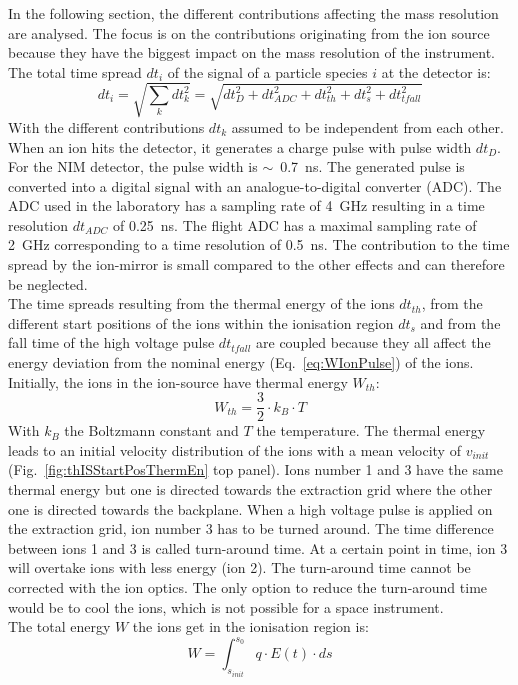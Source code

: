	In the following section, the different contributions affecting the mass resolution are analysed. The focus is on the contributions originating from the ion source because they have the biggest impact on the mass resolution of the instrument.\\
	The total time spread $dt_i$ of the signal of a particle species $i$ at the detector is:
	\begin{equation}
		dt_i = \sqrt{\sum_{k} dt_k^2} = \sqrt{dt_D^2 + dt_{ADC}^2 + dt_{th}^2 + dt_{s}^2 + dt_{tfall}^2}
		\label{eq:dti}
	\end{equation}
	With the different contributions $dt_k$ assumed to be independent from each other. When an ion hits the detector, it generates a charge pulse with pulse width $dt_D$. For the NIM detector, the pulse width is $\sim$~0.7~ns. The generated pulse is converted into a digital signal with an analogue-to-digital converter (ADC). The ADC used in the laboratory has a sampling rate of 4~GHz resulting in a time resolution $dt_{ADC}$ of 0.25~ns. The flight ADC has a maximal sampling rate of 2~GHz corresponding to a time resolution of 0.5~ns. The contribution to the time spread by the ion-mirror is small compared to the other effects and can therefore be neglected.\\ %

	The time spreads resulting from the thermal energy of the ions $dt_{th}$, from the different start positions of the ions within the ionisation region $dt_s$ and from the fall time of the high voltage pulse $dt_{tfall}$ are coupled because they all affect the energy deviation from the nominal energy (Eq.~\eqref{eq:WIonPulse}) of the ions. Initially, the ions in the ion-source have thermal energy $W_{th}$:
	\begin{equation}
		W_{th} = \frac{3}{2}\cdot k_B \cdot T
	\end{equation}
	With $k_B$ the Boltzmann constant and $T$ the temperature. The thermal energy leads to an initial velocity distribution of the ions with a mean velocity of $v_{init}$ (Fig.~\ref{fig:thISStartPosThermEn} top panel). Ions number 1 and 3 have the same thermal energy but one is directed towards the extraction grid where the other one is directed towards the backplane. When a high voltage pulse is applied on the extraction grid, ion number 3 has to be turned around. The time difference between ions 1 and 3 is called turn-around time. At a certain point in time, ion 3 will overtake ions with less energy (ion 2). The turn-around time cannot be corrected with the ion optics. The only option to reduce the turn-around time would be to cool the ions, which is not possible for a space instrument.\\
	The total energy $W$ the ions get in the ionisation region is:
	\begin{equation}
		W = \int_{s_{init}}^{s_0} q\cdot E(t)\cdot ds
		\label{eq:WionsISposEt}
	\end{equation}

